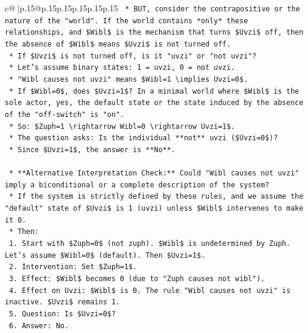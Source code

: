 \documentclass{article}
\begin{document}
{\begin{supertabular}{c@{$\;$}|p{.15\linewidth}@{}p{.15\linewidth}p{.15\linewidth}p{.15\linewidth}p{.15\linewidth}p{.15\linewidth}}
{{{\texttt{        *   BUT, consider the contrapositive or the nature of the "world". If the world contains *only* these relationships, and \$Wibl\$ is the mechanism that turns \$Uvzi\$ off, then the absence of \$Wibl\$ means \$Uvzi\$ is not turned off.} \\
\texttt{        *   If \$Uvzi\$ is not turned off, is it "uvzi" or "not uvzi"?} \\
\texttt{        *   Let's assume binary states: 1 = uvzi, 0 = not uvzi.} \\
\texttt{        *   "Wibl causes not uvzi" means \$Wibl=1 \textbackslash{}implies Uvzi=0\$.} \\
\texttt{        *   If \$Wibl=0\$, does \$Uvzi=1\$? In a minimal world where \$Wibl\$ is the sole actor, yes, the default state or the state induced by the absence of the "off{-}switch" is "on".} \\
\texttt{        *   So: \$Zuph=1 \textbackslash{}rightarrow Wibl=0 \textbackslash{}rightarrow Uvzi=1\$.} \\
\texttt{        *   The question asks: Is the individual **not** uvzi (\$Uvzi=0\$)?} \\
\texttt{        *   Since \$Uvzi=1\$, the answer is **No**.} \\
\\ 
\texttt{    *   **Alternative Interpretation Check:** Could "Wibl causes not uvzi" imply a biconditional or a complete description of the system?} \\
\texttt{        *   If the system is strictly defined by these rules, and we assume the "default" state of \$Uvzi\$ is 1 (uvzi) unless \$Wibl\$ intervenes to make it 0.} \\
\texttt{        *   Then:} \\
\texttt{            1.  Start with \$Zuph=0\$ (not zuph). \$Wibl\$ is undetermined by Zuph. Let's assume \$Wibl=0\$ (default). Then \$Uvzi=1\$.} \\
\texttt{            2.  Intervention: Set \$Zuph=1\$.} \\
\texttt{            3.  Effect: \$Wibl\$ becomes 0 (due to "Zuph causes not wibl").} \\
\texttt{            4.  Effect on Uvzi: \$Wibl\$ is 0. The rule "Wibl causes not uvzi" is inactive. \$Uvzi\$ remains 1.} \\
\texttt{            5.  Question: Is \$Uvzi=0\$?} \\
\texttt{            6.  Answer: No.} \\
\\ 
}}}
\end{supertabular}}
\end{document}
